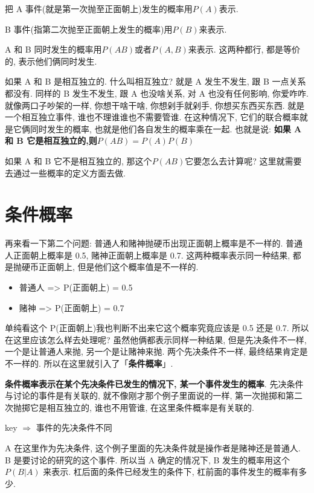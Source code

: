 把 A 事件(就是第一次抛至正面朝上)发生的概率用$P(A)$表示. 

B 事件(指第二次抛至正面朝上发生的概率)用$P(B)$来表示. 

A 和 B 同时发生的概率用$P(AB)$或者$P(A,B)$来表示. 这两种都行, 都是等价的, 表示他们俩同时发生. 

如果 A 和 B 是相互独立的. 什么叫相互独立? 就是 A 发生不发生, 跟 B 一点关系都没有. 同样的 B 发生不发生, 跟 A 也没啥关系, 对 A 也没有任何影响, 你爱咋咋. 就像两口子吵架的一样, 你想干啥干啥, 你想剁手就剁手, 你想买东西买东西. 就是一个相互独立事件, 谁也不理谁谁也不需要管谁. 在这种情况下, 它们的联合概率就是它俩同时发生的概率, 也就是他们各自发生的概率乘在一起. 也就是说: \textbf{如果 A 和 B 它是相互独立的,则$P(AB) = P(A)P(B)$}

如果 A 和 B 它不是相互独立的, 那这个$P(AB)$它要怎么去计算呢? 这里就需要去通过一些概率的定义方面去做. 

\section{条件概率}

再来看一下第二个问题: 普通人和赌神抛硬币出现正面朝上概率是不一样的. 普通人正面朝上概率是 0.5, 赌神正面朝上概率是 0.7. 这两种概率表示同一种结果, 都是抛硬币正面朝上, 但是他们这个概率值是不一样的. 

\begin{itemize}
  \item 普通人 => P(正面朝上) = 0.5 
  \item 赌神 => P(正面朝上) = 0.7
\end{itemize}

单纯看这个 P(正面朝上)我也判断不出来它这个概率究竟应该是 0.5 还是 0.7. 所以在这里应该怎么样去处理呢? 虽然他俩都表示同样一种结果, 但是先决条件不一样, 一个是让普通人来抛, 另一个是让赌神来抛. 两个先决条件不一样, 最终结果肯定是不一样的. 所以在这里就引入了「\textbf{条件概率}」. 

\textbf{条件概率表示在某个先决条件已发生的情况下, 某一个事件发生的概率}. 先决条件与讨论的事件是有关联的, 就不像刚才那个例子里面说的一样, 第一次抛掷和第二次抛掷它是相互独立的, 谁也不用管谁, 在这里条件概率是有关联的. 

key $\Rightarrow$ 事件的先决条件不同

A 在这里作为先决条件, 这个例子里面的先决条件就是操作者是赌神还是普通人. B 是要讨论的研究的这个事件. 所以当 A 确定的情况下, B 发生的概率用这个 $P(B|A)$ 来表示. 杠后面的条件已经发生的条件下, 杠前面的事件发生的概率有多少. 

